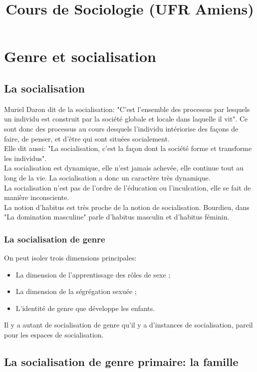 \documentclass[12pt, a4paper, openany]{book}
\date{}
\title{Cours de Sociologie (UFR Amiens)}
\begin{document}
\maketitle

\chapter{Genre et socialisation}

\section{La socialisation}

Muriel Daron dit de la socialisation: "C'est l'ensemble des processus par lesquels un individu est construit par la société globale et locale dans laquelle il vit". Ce sont donc des processus au cours desquels l'individu intériorise des façons de faire, de penser, et d'être qui sont situées socialement. \\
Elle dit aussi: "La socialisation, c'est la façon dont la société forme et transforme les individus". \\
La socialisation est dynamique, elle n'est jamais achevée, elle continue tout au long de la vie. La socialisation a donc un caractère très dynamique. \\
La socialisation n'est pas de l'ordre de l'éducation ou l'inculcation, elle se fait de manière inconsciente. \\
La notion d'habitus est très proche de la notion de socialisation. Bourdieu, dans "La domination masculine" parle d'habitus masculin et d'habitus féminin. 

\subsection{La socialisation de genre}

On peut isoler trois dimensions principales:
\begin{itemize}
\item La dimension de l'apprentissage des rôles de sexe ;
\item La dimension de la ségrégation sexuée ;
\item L'identité de genre que développe les enfants. 
\end{itemize}

Il y a autant de socialisation de genre qu'il y a d'instances de socialisation, pareil pour les espaces de socialisation.

\section{La socialisation de genre primaire: la famille}
\end{document}
